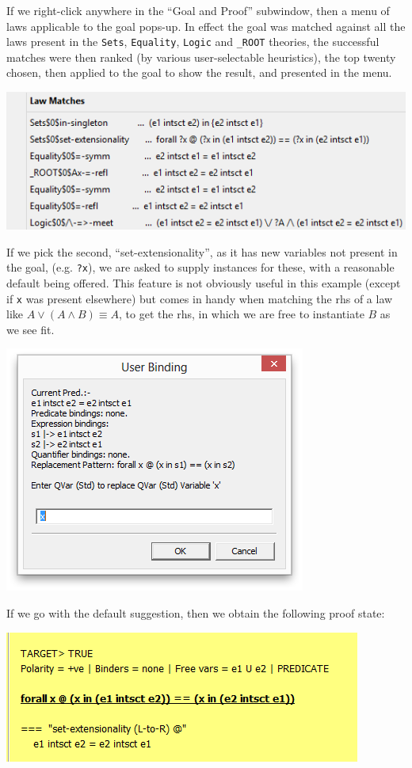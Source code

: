\documentclass[copyright]{eptcs}
\begin{document}
\noindent
If we right-click anywhere in the ``Goal and Proof'' subwindow,
then a menu of laws applicable to the goal pops-up.
In effect the goal was matched against all the laws present in the
\texttt{Sets}, \texttt{Equality}, \texttt{Logic} and \texttt{\_ROOT} theories, the successful matches were then ranked
(by various user-selectable heuristics), the top twenty chosen, then applied to the
goal to show the result, and presented in the menu.

\includegraphics[scale=0.5]{07-laws-applicable-to-goal.png}

\noindent
If we pick the second, ``set-extensionality'', as it has new variables not present in the goal, (e.g. \texttt{?x}), we are asked to supply instances for these, with a reasonable default being offered.
This feature is not obviously useful in this example (except if \texttt{x} was present elsewhere) but comes in handy when matching the rhs of a law like $A \lor (A \land B) \equiv A$, to get the rhs,
in which we are free to instantiate $B$ as we see fit.

  \includegraphics[scale=0.5]{08-instantiating-qvars.png}

\noindent
If we go with the default suggestion, then we obtain the following proof state:

  \includegraphics[scale=0.5]{09-extensionality-applied.png}
\end{document}
